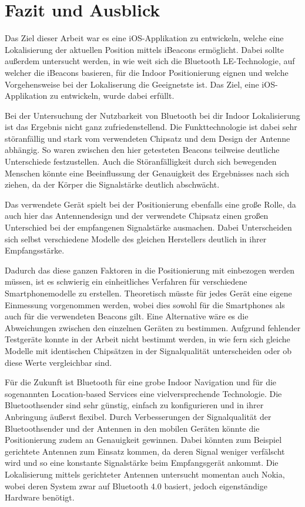 \chapter{Fazit und Ausblick}
\label{chap:resume}

Das Ziel dieser Arbeit war es eine iOS-Applikation zu entwickeln, welche eine Lokalisierung der aktuellen Position mittels iBeacons ermöglicht. Dabei sollte außerdem untersucht werden, in wie weit sich die Bluetooth LE-Technologie, auf welcher die iBeacons basieren, für die Indoor Positionierung eignen und welche Vorgehensweise bei der Lokaliserung die Geeignetste ist. Das Ziel, eine iOS-Applikation zu entwickeln, wurde dabei erfüllt. 

Bei der Untersuchung der Nutzbarkeit von Bluetooth bei dir Indoor Lokalisierung ist das Ergebnis nicht ganz zufriedenstellend. Die Funkttechnologie ist dabei sehr störanfällig und stark vom verwendeten Chipsatz und dem Design der Antenne abhängig. So waren zwischen den hier getesteten Beacons teilweise deutliche Unterschiede festzustellen. Auch die Störanfälligkeit durch sich bewegenden Menschen könnte eine Beeinflussung der Genauigkeit des Ergebnisses nach sich ziehen, da der Körper die Signalstärke deutlich abschwächt.

Das verwendete Gerät spielt bei der Positionierung ebenfalls eine große Rolle, da auch hier das Antennendesign und der verwendete Chipsatz einen großen Unterschied bei der empfangenen Signalstärke ausmachen. Dabei Unterscheiden sich selbst verschiedene Modelle des gleichen Herstellers deutlich in ihrer Empfangsstärke. 

Dadurch das diese ganzen Faktoren in die Positionierung mit einbezogen werden müssen, ist es schwierig ein einheitliches Verfahren für verschiedene Smartphonemodelle zu erstellen. Theoretisch müsste für jedes Gerät eine eigene Einmessung vorgenommen werden, wobei dies sowohl für die Smartphones als auch für die verwendeten Beacons gilt.
Eine Alternative wäre es die Abweichungen zwischen den einzelnen Geräten zu bestimmen. Aufgrund fehlender Testgeräte konnte in der Arbeit nicht bestimmt werden, in wie fern sich gleiche Modelle mit identischen Chipsätzen in der Signalqualität unterscheiden oder ob diese Werte vergleichbar sind.

Für die Zukunft ist Bluetooth für eine grobe Indoor Navigation und für die sogenannten Location-based Services eine vielversprechende Technologie. Die Bluetoothsender sind sehr günstig, einfach zu konfigurieren und in ihrer Anbringung äußerst flexibel. Durch Verbesserungen der Signalqualität der Bluetoothsender und der Antennen in den mobilen Geräten könnte die Positionierung zudem an Genauigkeit gewinnen. Dabei könnten zum Beispiel gerichtete Antennen zum Einsatz kommen, da deren Signal weniger verfälscht wird und so eine konstante Signalstärke beim Empfangsgerät ankommt. Die Lokalisierung mittels gerichteter Antennen untersucht momentan auch Nokia, wobei deren System zwar auf Bluetooth 4.0 basiert, jedoch eigenständige Hardware benötigt.

